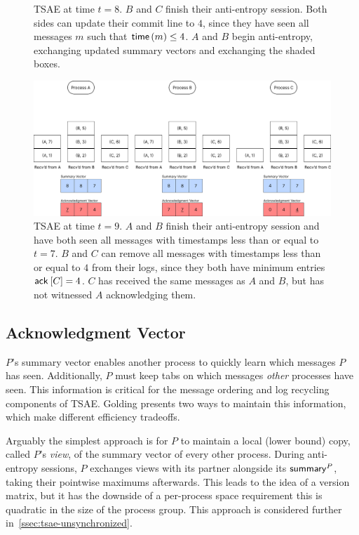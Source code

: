 \documentclass[]             %
{NASA}                       %
\theoremstyle{definition}
\begin{document}
\begin{landscape}
\begin{figure}[h]
    \caption{TSAE at time $t=8$. $B$ and $C$ finish their anti-entropy session. Both sides can update their commit line to $4$, since they have seen all messages $m$ such that $\mathsf{time}\left(m\right) \leq 4$. $A$ and $B$ begin anti-entropy, exchanging updated summary vectors and exchanging the shaded boxes.}
    \label{fig:tsae6}
  \end{figure}
  \begin{figure}[h]
    \centering
    \includegraphics[width=1.4\textwidth]{images/tsae/TSAE9.png}
    \caption{TSAE at time $t=9$. $A$ and $B$ finish their anti-entropy
      session and have both seen all messages with timestamps less than
      or equal to $t = 7$. $B$ and $C$ can remove all messages with
      timestamps less than or equal to $4$ from their logs, since they
      both have minimum entries $\mathsf{ack}^{}\left[C\right] = 4$. $C$ has received the
      same messages as $A$ and $B$, but has not witnessed $A$
      acknowledging them.}
    \label{fig:tsae6}
  \end{figure}
\end{landscape}

\subsection{Acknowledgment Vector}
\label{ssec:tsae-acknowledgment}
$P$'s summary vector enables another process to quickly learn which
messages $P$ has seen. Additionally, $P$ must keep tabs on which
messages \emph{other} processes have seen. This information is
critical for the message ordering and log recycling components of
TSAE. Golding presents two ways to maintain this information, which
make different efficiency tradeoffs.

Arguably the simplest approach is for $P$ to maintain a local (lower
bound) copy, called $P$'s \emph{view}, of the summary vector of every
other process. During anti-entropy sessions, $P$ exchanges views with
its partner alongside its $\mathsf{summary}^{P}$, taking their pointwise
maximums afterwards. This leads to the idea of a version matrix, but
it has the downside of a per-process space requirement this is
quadratic in the size of the process group. This approach is
considered further in~\ref{ssec:tsae-unsynchronized}.
\end{document}
